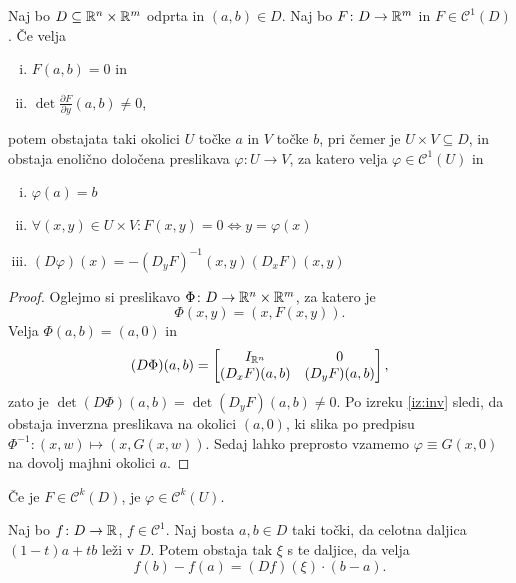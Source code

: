 \begin{izrek}
\label{iz:imp}
Naj bo $D \subseteq \mathbb{R}^n \times \mathbb{R}^m$ odprta in $(a,b) \in D$.
Naj bo $F \colon D\to \mathbb{R}^m$ in $F \in \mathcal{C}^1(D)$. Če velja

\begin{enumerate}[i)]
\item $F(a,b) = 0$ in
\item $\det \frac{\partial F}{\partial y}(a,b) \ne 0$,
\end{enumerate}

potem obstajata taki okolici $U$ točke $a$ in $V$ točke $b$, pri
čemer je $U \times V \subseteq D$, in obstaja enolično določena
preslikava $\varphi \colon U \to V$, za katero velja
$\varphi \in \mathcal{C}^1(U)$ in
\begin{enumerate}[i)]
\item $\varphi(a) = b$
\item $\forall (x,y) \in U \times V \colon F(x,y) = 0 \iff
y = \varphi(x)$
\item $(D\varphi)(x) = -(D_yF)^{-1}(x,y) (D_xF)(x,y)$
\end{enumerate}
\end{izrek}

\begin{proof}
Oglejmo si preslikavo $\Phi \colon D \to \mathbb{R}^n \times \mathbb{R}^m$, za
katero je
\[
\Phi(x,y) = (x, F(x,y)).
\]
Velja $\Phi(a,b) = (a,0)$ in
\[
(D\Phi)(a,b) =
\begin{bmatrix}
I_{\mathbb{R}^n}    & 0           \\ 
(D_xF)(a,b) & (D_yF)(a,b)
\end{bmatrix},
\]
zato je $\det(D\Phi)(a,b) = \det (D_yF)(a,b) \ne 0$. Po izreku
\ref{iz:inv} sledi, da obstaja inverzna preslikava na okolici
$(a,0)$, ki slika po predpisu
$\Phi^{-1} \colon (x,w) \mapsto (x, G(x,w))$. Sedaj lahko
preprosto vzamemo $\varphi \equiv G(x,0)$ na dovolj majhni
okolici $a$.
\end{proof}

\begin{opomba}
Če je $F \in \mathcal{C}^k(D)$, je $\varphi \in \mathcal{C}^k(U)$.
\end{opomba}


\begin{lema}
Naj bo $f \colon D \to \mathbb{R}$, $f \in \mathcal{C}^1$. Naj bosta
$a,b \in D$ taki točki, da celotna daljica $(1-t)a + tb$ leži v
$D$.
Potem obstaja tak $\xi$ s te daljice, da velja
\[
f(b) - f(a) = (Df)(\xi) \cdot (b-a).
\]
\end{lema}

